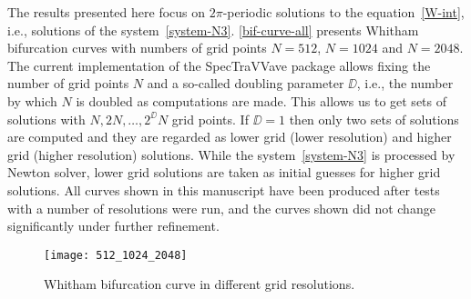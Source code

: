 The results presented here focus on $2\pi$-periodic solutions to the equation~\eqref{W-int}, 
i.e., solutions of the system~\eqref{system-N3}. 
\autoref{bif-curve-all} presents Whitham bifurcation curves with numbers of grid points 
$N = 512$, $N=1024$ and $N=2048$. 
The current implementation of the \textsf{SpecTraVVave} package allows fixing the number of grid points $N$ 
and a so-called doubling parameter $\DD$, 
i.e., the number by which $N$ is doubled as computations are made. 	
This allows us to get sets of solutions with $N, 2N, \ldots, 2^{\DD} N$ grid points. 
If $\DD = 1$ then only two sets of solutions are computed and they are regarded as 
lower grid (lower resolution) and higher grid (higher resolution) solutions.
While the system~\eqref{system-N3} is processed by Newton solver, 
lower grid solutions are taken as initial guesses for higher grid solutions. 
All curves shown in this manuscript have been produced
after tests with a number of resolutions were run, 
and the curves shown did not change significantly under further refinement.

\begin{figure}[ht]
\centering
\texttt{[image: 512\_1024\_2048]}{}      
\caption{\small Whitham bifurcation curve in different grid resolutions.}
\label{bif-curve-all}
\end{figure} 


